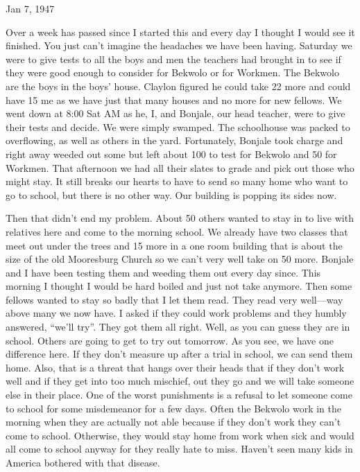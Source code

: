 \documentclass[
]{book}
\begin{document}
Jan 7, 1947

Over a week has passed since I started this and every day I thought I would see it finished. You just can't imagine the headaches we have been having. Saturday we were to give tests to all the boys and men the teachers had brought in to see if they were good enough to consider for Bekwolo or for Workmen. The Bekwolo are the boys in the boys' house. Claylon figured he could take 22 more and could have 15 me as we have just that many houses and no more for new fellows. We went down at 8:00 Sat AM as he, I, and Bonjale, our head teacher, were to give their tests and decide. We were simply swamped. The schoolhouse was packed to overflowing, as well as others in the yard. Fortunately, Bonjale took charge and right away weeded out some but left about 100 to test for Bekwolo and 50 for Workmen. That afternoon we had all their slates to grade and pick out those who might stay. It still breaks our hearts to have to send so many home who want to go to school, but there is no other way. Our building is popping its sides now.

Then that didn't end my problem. About 50 others wanted to stay in to live with relatives here and come to the morning school. We already have two classes that meet out under the trees and 15 more in a one room building that is about the size of the old Mooresburg Church so we can't very well take on 50 more. Bonjale and I have been testing them and weeding them out every day since. This morning I thought I would be hard boiled and just not take anymore. Then some fellows wanted to stay so badly that I let them read. They read very well---way above many we now have. I asked if they could work problems and they humbly answered, ``we'll try''. They got them all right. Well, as you can guess they are in school. Others are going to get to try out tomorrow. As you see, we have one difference here. If they don't measure up after a trial in school, we can send them home. Also, that is a threat that hangs over their heads that if they don't work well and if they get into too much mischief, out they go and we will take someone else in their place. One of the worst punishments is a refusal to let someone come to school for some misdemeanor for a few days. Often the Bekwolo work in the morning when they are actually not able because if they don't work they can't come to school. Otherwise, they would stay home from work when sick and would all come to school anyway for they really hate to miss. Haven't seen many kids in America bothered with that disease.
\end{document}
